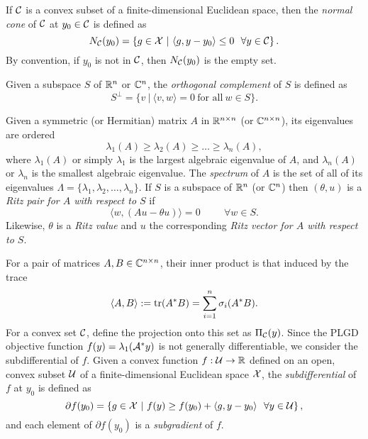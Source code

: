 If ${\mathcal C}$ is a convex subset of a finite-dimensional Euclidean space, then the \textit{normal cone} of ${\mathcal C}$ at $y_0 \in {\mathcal C}$ is defined as
\begin{equation} 			\label{Def:normal_cone}
N_{\mathcal C}(y_0) = \left\{ g \in {\mathcal X} \ | \ \langle g, y - y_0 \rangle \leq 0 \ \ \forall y \in {\mathcal C} \right\}.
\end{equation}
By convention, if $y_0$ is not in ${\mathcal C}$, then $N_{\mathcal C}(y_0)$ is the empty set.

Given a subspace $S$ of ${\mathbb R}^n$ or ${\mathbb C}^n$, the \textit{orthogonal complement} of $S$ is defined as
\begin{equation}
S^\perp = \{ v \ | \ \langle v, w \rangle = 0 \ \text{for all} \ w \in S \}.
\end{equation}


Given a symmetric (or Hermitian) matrix $A$ in ${\mathbb R}^{n \times n}$ (or ${\mathbb C}^{n \times n}$), its eigenvalues are ordered
\begin{equation}			\label{Def:eigenvalues}
\lambda_1(A) \geq \lambda_2(A) \geq \ldots \geq \lambda_n(A),
\end{equation}
where $\lambda_1(A)$ or simply $\lambda_1$ is the largest algebraic eigenvalue of $A$, and $\lambda_n(A)$ or $\lambda_n$ is the smallest algebraic eigenvalue.  The \textit{spectrum} of $A$ is the set of all of its eigenvalues $\Lambda = \{ \lambda_1, \lambda_2, \ldots, \lambda_n\}$.
If $S$ is a subspace of ${\mathbb R}^n$ (or ${\mathbb C}^n$) then $(\theta, u)$ is a \textit{Ritz pair for $A$ with respect to $S$} if 
\begin{equation} 			\label{Def:Ritz_pair_val_vec}
\langle w, (Au-\theta u) \rangle = 0 \hspace{1cm} \forall w \in S.
\end{equation}
Likewise, $\theta$ is a \textit{Ritz value} and $u$ the corresponding \textit{Ritz vector for $A$ with respect to $S$}.

For a pair of matrices $A, B \in {\mathbb C}^{n \times n}$, their inner product is that induced by the trace
\begin{equation}			\label{Def:trace_inner_product}
\langle A, B \rangle := \mathrm{tr}(A^*B) = \sum_{i=1}^n \sigma_i(A^*B).
\end{equation}
For a convex set ${\mathcal C}$, define the projection onto this set as $\Pi_{\mathcal C}(y)$.  Since the PLGD objective function $f(y) = \lambda_1({\mathcal A}^*y)$ is not generally differentiable, we consider the subdifferential of $f$.  Given a convex function $f : {\mathcal U} \rightarrow {\mathbb R}$ defined on an open, convex subset ${\mathcal U}$ of a finite-dimensional Euclidean space ${\mathcal X}$, the \textit{subdifferential} of $f$ at $y_0$ is defined as
\begin{equation}
	\label{Def:subdifferential}
	\partial f(y_0) = \left\{  g \in {\mathcal X} \ | \ f(y) \geq f(y_0) + \langle g, y - y_0 \rangle \ \ \forall y \in {\mathcal U}	\right\},
\end{equation}
and each element of $\partial f(y_0)$ is a \textit{subgradient} of $f$.

